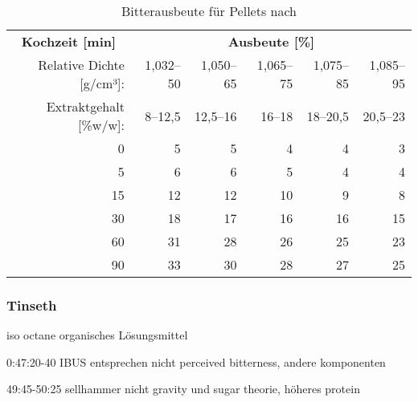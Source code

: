 \documentclass[a4paper,parskip=half]{scrartcl}
\begin{document}
\begin{table}[H]
\centering
\begin{tabular}{rrrrrr} 
\toprule
\multicolumn{1}{c}{\textbf{Kochzeit [min]}} & \multicolumn{5}{c}{\textbf{Ausbeute [\%]}}                                 \\
Relative Dichte [g/cm³]:                    & 1,032–50 & 1,050–65 & 1,065–75 & 1,075–85 & 1,085–95  \\
Extraktgehalt [\%w/w]:                    & 8–12,5 & 12,5–16 & 16–18 & 18–20,5 & 20,5–23  \\
\midrule
0                                            & 5        & 5        & 4                            & 4                            & 3                             \\
5                                            & 6        & 6        & 5                            & 4                            & 4                             \\
15                                           & 12       & 12       & 10                           & 9                            & 8                             \\
30                                           & 18       & 17       & 16                           & 16                           & 15                            \\
60                                           & 31       & 28       & 26                           & 25                           & 23                            \\
90                                           & 33       & 30       & 28                           & 27                           & 25                     \\
\bottomrule
\end{tabular}
\caption{Bitterausbeute für Pellets nach \citeauthor{Noonan1996} \parencite[215]{Noonan1996}}
\label{table:noonanutilpellets}
\end{table}

\subsubsection*{Tinseth}

iso octane organisches Lösungsmittel

0:47:20-40
IBUS entsprechen nicht perceived bitterness, andere komponenten

49:45-50:25
sellhammer nicht gravity und sugar theorie, höheres protein
\end{document}
